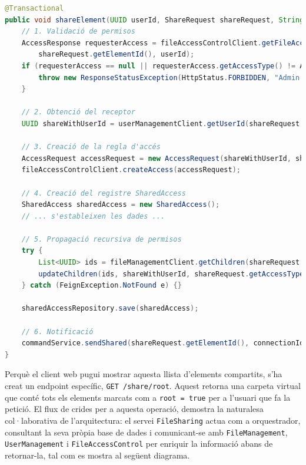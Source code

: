 \begin{lstlisting}[language=Java, caption={Lògica principal per compartir un element a `FileSharingService`}]
@Transactional
public void shareElement(UUID userId, ShareRequest shareRequest, String connectionId) {
    // 1. Validació de permisos
    AccessResponse requesterAccess = fileAccessControlClient.getFileAccess(
        shareRequest.getElementId(), userId);
    if (requesterAccess == null || requesterAccess.getAccessType() != AccessType.ADMIN.ordinal()) {
        throw new ResponseStatusException(HttpStatus.FORBIDDEN, "Admin permission required...");
    }

    // 2. Obtenció del receptor
    UUID shareWithUserId = userManagementClient.getUserId(shareRequest.getUser());

    // 3. Creació de la regla d'accés
    AccessRequest accessRequest = new AccessRequest(shareWithUserId, shareRequest.getElementId(), shareRequest.getAccessType().ordinal());
    fileAccessControlClient.createAccess(accessRequest);
    
    // 4. Creació del registre SharedAccess
    SharedAccess sharedAccess = new SharedAccess();
    // ... s'estableixen les dades ...
    
    // 5. Propagació recursiva de permisos
    try {
        List<UUID> ids = fileManagementClient.getChildren(shareRequest.getElementId());
        updateChildren(ids, shareWithUserId, shareRequest.getAccessType().ordinal());
    } catch (FeignException.NotFound e) {}

    sharedAccessRepository.save(sharedAccess);
    
    // 6. Notificació
    commandService.sendShared(shareRequest.getElementId(), connectionId, userId.toString(), parentIdString);
}
\end{lstlisting}

Perquè el client web pugui mostrar aquesta llista d'elements compartits, s'ha creat un endpoint específic, \texttt{GET /share/root}. Aquest retorna una carpeta virtual que conté tots els elements marcats com a \texttt{root = true} per a l'usuari que fa la petició. El flux de crides per a aquesta operació, demostra la naturalesa col·laborativa de l'arquitectura: el servei \texttt{FileSharing} actua com a orquestrador, consultant la seva pròpia base de dades i comunicant-se amb \texttt{FileManagement}, \texttt{UserManagement} i \texttt{FileAccessControl} per enriquir la informació abans de retornar-la, tal com es mostra al següent diagrama.

